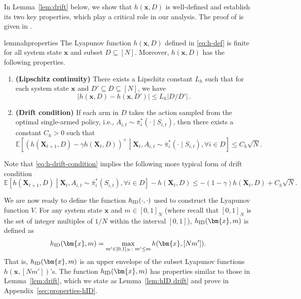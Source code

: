 \documentclass{article}
\theoremstyle{plain}
\theoremstyle{remark}
\newcommand{\abs}[1]{\left\lvert#1\right\rvert}
\newcommand{\mx}{\bm{x}}
\newcommand{\maxmp}{\max_{m'\in[0,1]_N\colon m'\leq m}}
\newcommand{\ID}{\textnormal{ID}}
\def\mX{{\bm{X}}}
\newcommand{\EE}{\mathbb{E}}
\newcommand{\bracket}[1]{\left(#1\right)}
\newcommand{\mbracket}[1]{\left[#1\right]}
\begin{document}
In Lemma~\ref{lem:drift} below, we show that $h(\mx,D)$ is well-defined and establish its two key properties, which play a critical role in our analysis.  The proof of  is given in .
\begin{restatable}{lemma}{hproperties}\label{lem:drift}
The Lyapunov function $h(\mx, D)$ defined in \eqref{eq:h-def} is finite for all system state $\mx$ and subset $D\subseteq[N]$. 
Moreover, $h(\mx, D)$ has the following properties.
\begin{enumerate}
    \item \textbf{(Lipschitz continuity)} There exists a Lipschitz constant $L_h$ such that for each system state $\mx$ and $D'\subseteq D\subseteq [N]$, we have
    \begin{equation}
        \label{eq:h-lipschitz}
        \abs{h(\mx,D)-h(\mx,D')}\leq L_h\abs{D/D'}\,.
    \end{equation}
    \item \textbf{(Drift condition)} If each arm in $D$ takes the action sampled from the optimal single-armed policy, i.e., ${A}_{i,t}\sim\bar{\pi}_i^*(\cdot\mid S_{i,t})$, then there exists a constant $C_h > 0$ such that
    \begin{equation}
        \label{eq:h-drift-condition}
        \EE\mbracket{\bracket{h(\mX_{t+1},D)-\gamma h(\mX_t,D)}^+\middle|\mX_t,{A}_{i,t}\sim\bar{\pi}_i^*(\cdot\mid S_{i,t}),\forall i\in D}\leq C_h\sqrt{N}.
    \end{equation}
\end{enumerate}
\end{restatable}
Note that \eqref{eq:h-drift-condition} implies the following more typical form of drift condition
\begin{equation}
    \EE\mbracket{h(\mX_{t+1},D)\middle |\mX_t,{A}_{i,t}\sim\bar{\pi}_i^*(S_{i,t}),\forall i\in D}-h(\mX_{t},D)\leq -(1-\gamma)h(\mX_{t},D)+C_h\sqrt{N}.
\end{equation}


We are now ready to define the function $h_{\ID}(\cdot,\cdot)$ used to construct the Lyapunov function $V$.
For any system state $\mx$ and $m\in[0,1]_N$ (where recall that $[0,1]_N$ is the set of integer multiples of $1/N$ within the interval $[0,1]$), $h_{\ID}(\mx,m)$ is defined as
\begin{equation}
    \label{eq:hid-def}
    h_{\ID}(\mx,m)=\maxmp h(\mx,[Nm']).
\end{equation}
That is, $h_{\ID}(\mx,m)$ is an upper envelope of the subset Lyapunov functions $h(\mx,[Nm'])$'s.
The function $h_{\ID}(\mx,m)$ has properties similar to those in Lemma~\ref{lem:drift}, which we state as Lemma~\ref{lem:hID drift} and prove in Appendix~\ref{sec:properties-hID}.
\end{document}

